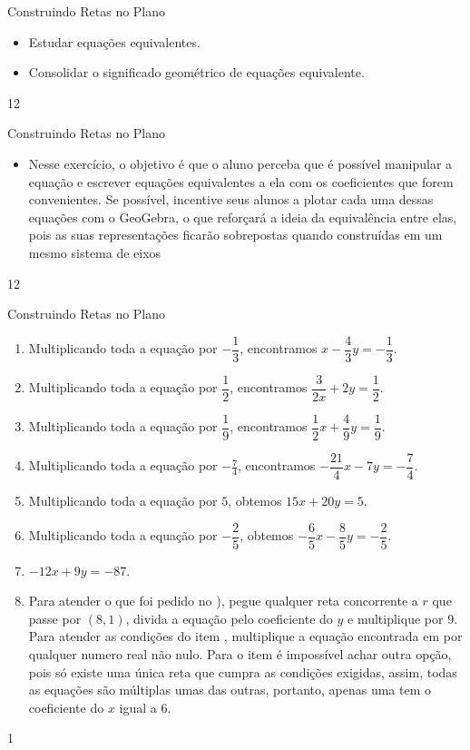 \clearpage
\def\currentcolor{session2}
\begin{objectives}{Construindo Retas no Plano}
{
\begin{itemize}
\item Estudar equações equivalentes.
\item Consolidar o significado geométrico de equações equivalente. 
\end{itemize}
}{1}{2}
\end{objectives}
\begin{sugestions}{Construindo Retas no Plano}
{
\begin{itemize}
\item Nesse exercício, o objetivo é que o aluno perceba que é possível manipular a equação e escrever equações equivalentes a ela com os coeficientes que forem convenientes. Se possível, incentive seus alunos a plotar cada uma dessas equações com o GeoGebra, o que reforçará a ideia da equivalência entre elas, pois as suas representações ficarão sobrepostas quando construídas em um mesmo sistema de eixos
\end{itemize}
}{1}{2}
\end{sugestions}
\begin{answer}{Construindo Retas no Plano}
{
\begin{enumerate}
\item Multiplicando toda a equação por $-\dfrac{1}{3}$, encontramos $x-\dfrac{4}{3}y = -\dfrac{1}{3}$.
\item Multiplicando toda a equação por $\dfrac{1}{2}$, encontramos $\dfrac{3}{2x} + 2y =\dfrac{1}{2}$.
\item Multiplicando toda a equação por $\dfrac{1}{9}$, encontramos $\dfrac{1}{2}x + \dfrac{4}{9}y = \dfrac{1}{9}$.
\item Multiplicando toda a equação por $-\frac{7}{4}$, encontramos $-\dfrac{21}{4}x - 7y = - \dfrac{7}{4}$.
\item Multiplicando toda a equação por $5$, obtemos $15x + 20y = 5$.
\item Multiplicando toda a equação por $-\dfrac{2}{5}$, obtemos $-\dfrac{6}{5}x - \dfrac{8}{5}y = -\dfrac{2}{5}$.
\item $-12x+9y=-87$.
\item Para atender o que foi pedido no ), pegue qualquer reta concorrente a $r$ que passe por $(8,1)$, divida a equação pelo coeficiente do $y$ e multiplique por $9$. Para atender as condições do item , multiplique a equação encontrada em  por qualquer numero real não nulo. Para o item  é impossível achar outra opção, pois só existe uma única reta que cumpra as condições exigidas, assim, todas as equações são múltiplas umas das outras, portanto, apenas uma tem o coeficiente do $x$ igual a $6$.
\end{enumerate}
}{1}
\end{answer}

